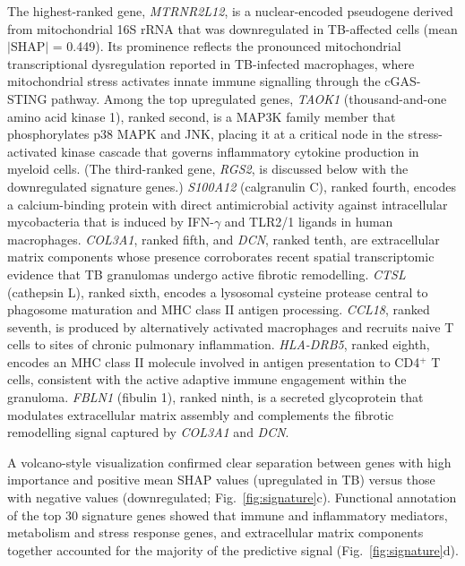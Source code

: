 \documentclass[12pt]{article}
\begin{document}
The highest-ranked gene, \textit{MTRNR2L12}, is a nuclear-encoded pseudogene derived from mitochondrial 16S rRNA that was downregulated in TB-affected cells (mean $|$SHAP$|$ = 0.449). Its prominence reflects the pronounced mitochondrial transcriptional dysregulation reported in TB-infected macrophages, where mitochondrial stress activates innate immune signalling through the cGAS-STING pathway\cite{wiens2018}. Among the top upregulated genes, \textit{TAOK1} (thousand-and-one amino acid kinase 1), ranked second, is a MAP3K family member that phosphorylates p38 MAPK and JNK, placing it at a critical node in the stress-activated kinase cascade that governs inflammatory cytokine production in myeloid cells\cite{raman2007}. (The third-ranked gene, \textit{RGS2}, is discussed below with the downregulated signature genes.) \textit{S100A12} (calgranulin C), ranked fourth, encodes a calcium-binding protein with direct antimicrobial activity against intracellular mycobacteria that is induced by IFN-$\gamma$ and TLR2/1 ligands in human macrophages\cite{realegeno2016}. \textit{COL3A1}, ranked fifth, and \textit{DCN}, ranked tenth, are extracellular matrix components whose presence corroborates recent spatial transcriptomic evidence that TB granulomas undergo active fibrotic remodelling\cite{scp3227}. \textit{CTSL} (cathepsin L), ranked sixth, encodes a lysosomal cysteine protease central to phagosome maturation and MHC class II antigen processing\cite{gideon2022,honey2003}. \textit{CCL18}, ranked seventh, is produced by alternatively activated macrophages and recruits naive T cells to sites of chronic pulmonary inflammation\cite{koth2004,schutyser2002}. \textit{HLA-DRB5}, ranked eighth, encodes an MHC class II molecule involved in antigen presentation to CD4$^{+}$ T cells, consistent with the active adaptive immune engagement within the granuloma. \textit{FBLN1} (fibulin 1), ranked ninth, is a secreted glycoprotein that modulates extracellular matrix assembly and complements the fibrotic remodelling signal captured by \textit{COL3A1} and \textit{DCN}.

A volcano-style visualization confirmed clear separation between genes with high importance and positive mean SHAP values (upregulated in TB) versus those with negative values (downregulated; Fig.~\ref{fig:signature}c). Functional annotation of the top 30 signature genes showed that immune and inflammatory mediators, metabolism and stress response genes, and extracellular matrix components together accounted for the majority of the predictive signal (Fig.~\ref{fig:signature}d).
\end{document}
